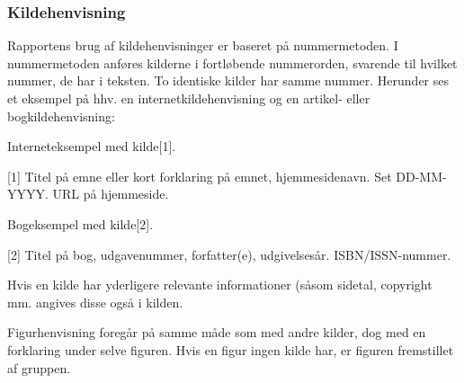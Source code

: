 \subsubsection{Kildehenvisning}
Rapportens brug af kildehenvisninger er baseret på nummermetoden. I nummermetoden anføres kilderne i fortløbende nummerorden, svarende til hvilket nummer, de har i teksten. To identiske kilder har samme nummer. Herunder ses et eksempel på hhv. en internetkildehenvisning og en artikel- eller bogkildehenvisning:

Interneteksempel med kilde[1].

[1] Titel på emne eller kort forklaring på emnet, hjemmesidenavn. Set DD-MM-YYYY. URL på hjemmeside.


Bogeksempel med kilde[2].

[2] Titel på bog, udgavenummer, forfatter(e), udgivelsesår. ISBN/ISSN-nummer.


Hvis en kilde har yderligere relevante informationer (såsom sidetal, copyright mm. angives disse også i kilden.


Figurhenvisning foregår på samme måde som med andre kilder, dog med en forklaring under selve figuren. Hvis en figur ingen kilde har, er figuren fremstillet af gruppen.
